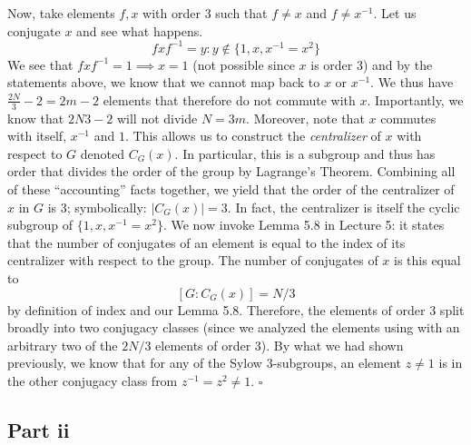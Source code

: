 \documentclass[letterpaper]{article}
\newcommand*{\QED}{\hfill\ensuremath{\square}}%
\begin{document}
Now, take elements $ f, x $ with order $ 3 $ such that $ f \neq x $ and $ f \neq x^{-1} $.
Let us conjugate $ x $ and see what happens.
\[
fxf^{-1} = y : y \not\in \{1, x, x^{-1} = x^{2}\}
\]
We see that $ fxf^{-1} = 1 \implies x = 1 $ (not possible since $ x $ is order $ 3 $) and by the statements above, we know that we cannot map back to $ x $ or $ x^{-1} $.
We thus have $ \frac{2N}{3} - 2 = 2m - 2 $ elements that therefore do not commute with $ x $.
Importantly, we know that $ {2N}{3} - 2 $ will not divide $ N =  3m $.
Moreover, note that $ x $ commutes with itself, $ x^{-1} $ and $ 1 $.
This allows us to construct the \textit{centralizer} of $ x $ with respect to $ G $ denoted $ C_G(x) $.
In particular, this is a subgroup and thus has order that divides the order of the group by Lagrange's Theorem.
Combining all of these ``accounting'' facts together, we yield that the order of the centralizer of $ x $ in $ G $ is $ 3 $; symbolically: $ \left|C_G(x) \right| = 3 $.
In fact, the centralizer is itself the cyclic subgroup of $ \{1, x, x^{-1} = x^{2}\} $.
We now invoke Lemma 5.8 in Lecture 5: it states that the number of conjugates of an element is equal to the index of its centralizer with respect to the group.
The number of conjugates of $ x $ is this equal to
\[
\left[G : C_G(x) \right] = N / 3
\]
by definition of index and our Lemma 5.8.
Therefore, the elements of order $ 3 $ split broadly into two conjugacy classes (since we analyzed the elements using with an arbitrary two of the $ 2N/3 $ elements of order $ 3 $).
By what we had shown previously, we know that for any of the Sylow $ 3 $-subgroups, an element $ z \neq 1 $ is in the other conjugacy class from $ z^{-1} = z^{2} \neq 1 $.
\QED{}

\subsection{Part ii}
\label{subs:1Partii}
\end{document}
